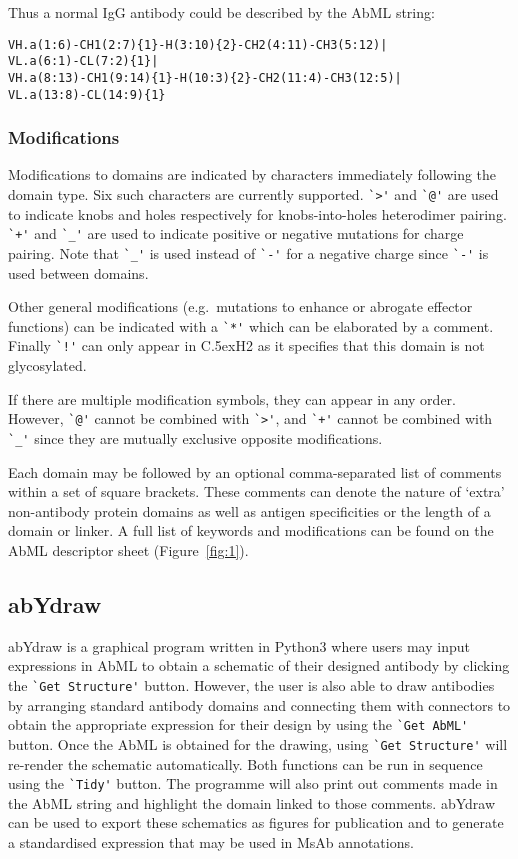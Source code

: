 \documentclass[a4paper]{article}
\newcommand{\CH}[1]{\mbox{C\lower.5ex\hbox{\scriptsize H}#1}}
\begin{document}
Thus a normal IgG antibody could be described by the AbML string:
\begin{verbatim}
VH.a(1:6)-CH1(2:7){1}-H(3:10){2}-CH2(4:11)-CH3(5:12)|
VL.a(6:1)-CL(7:2){1}|
VH.a(8:13)-CH1(9:14){1}-H(10:3){2}-CH2(11:4)-CH3(12:5)|
VL.a(13:8)-CL(14:9){1}
\end{verbatim}

\subsubsection{Modifications}
Modifications to domains are indicated by characters immediately following the
domain type. Six such characters are currently supported.
\verb|`>'| and \verb|`@'| are used to indicate
knobs and holes respectively for knobs-into-holes heterodimer pairing.
\verb|`+'| and \verb|`_'| are used to indicate
positive or negative mutations for charge pairing. Note that
\verb|`_'| is used instead of \verb|`-'| for a negative charge since
\verb|`-'| is used between domains.

Other general modifications (e.g.\ mutations to enhance or abrogate
effector functions) can be indicated with a \verb|`*'| which can be
elaborated by a comment. Finally \verb|`!'| can only appear in \CH{2}
as it specifies that this domain is not glycosylated.

If there are multiple modification symbols, they can appear in any
order.  However, \verb|`@'| cannot be combined with \verb|`>'|, and
\verb|`+'| cannot be combined with \verb|`_'| since they are mutually
exclusive opposite modifications.

Each domain may be followed by an optional comma-separated list of comments
within a set of square brackets. These comments can denote the nature of
`extra' non-antibody protein domains as well as antigen
specificities or the length of a domain or linker. A full list of
keywords and modifications can be found on the AbML descriptor sheet
(Figure~\ref{fig:1}).

\subsection{abYdraw}
abYdraw is a graphical program written in Python3 where users may
input expressions in AbML to obtain a schematic of their designed
antibody by clicking the \verb|`Get Structure'| button. However, the user is
also able to draw antibodies by arranging standard antibody domains
and connecting them with connectors to obtain the appropriate expression
for their design by using the \verb|`Get AbML'| button. Once the AbML
is obtained for the drawing, using \verb|`Get Structure'| will re-render the
schematic automatically. Both functions can be run in sequence using the
\verb|`Tidy'| button. The programme will also print out comments made in the
AbML string and highlight the domain linked to those comments. abYdraw
can be used to export these schematics as figures for
publication and to generate a standardised expression that may be used
in MsAb annotations.  
\end{document}
